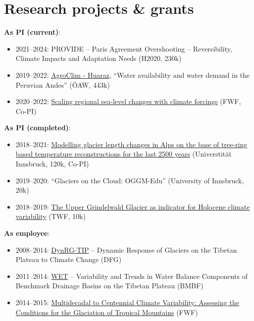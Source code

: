 \section*{Research projects \& grants}
\label{\detokenize{ch08/cv:research-projects-grants}}
\textbf{As PI (current)}:
\begin{itemize}[nosep]
\item {} 
2021--2024: PROVIDE -- Paris Agreement Overshooting -- Reversibility, Climate Impacts and Adaptation Needs (H2020, 230k\texteuro{})

\item {} 
2019--2022: \href{https://agroclim-huaraz.info/}{AgroClim - Huaraz}, “Water availability and water demand in the Peruvian Andes” (ÖAW, 443k\texteuro{})

\item {} 
2020--2022: \href{https://www.uibk.ac.at/acinn/research/ice-and-climate/projects/scaling\_regional\_sea\_level\_changes.html.en}{Scaling regional sea-level changes with climate forcings} (FWF, Co-PI)

\end{itemize}

\textbf{As PI (completed)}:
\begin{itemize}[nosep]
\item {} 
2018--2021: \href{https://www.uibk.ac.at/acinn/research/ice-and-climate/projects/modelling-glacier-length-changes.html.en}{Modelling glacier length changes in Alps on the base of tree-ring based temperature reconstructions for the last 2500 years} (Universtität Innsbruck, 120k\texteuro{}, Co-PI)

\item {} 
2019--2020: “Glaciers on the Cloud: OGGM-Edu” (University of Innsbruck, 20k\texteuro{})

\item {} 
2018--2019: \href{https://www.uibk.ac.at/acinn/research/ice-and-climate/projects/holocene-climate-variability.html.en}{The Upper Grindelwald Glacier as indicator for Holocene climate variability} (TWF, 10k\texteuro{})

\end{itemize}

\textbf{As employee}:
\begin{itemize}[nosep]
\item {} 
2008--2014: \href{https://www.klima.tu-berlin.de/index.php?show=reg\_klima\_hochasien\_dynrgtip\&lan=en}{DynRG-TIP} -- Dynamic Response of Glaciers on the Tibetan Plateau to Climate Change (DFG)

\item {} 
2011--2014: \href{https://www.klima.tu-berlin.de/index.php?show=reg\_klima\_hochasien\_wet\&lan=en}{WET} -- Variability and Trends in Water Balance Components of Benchmark Drainage Basins on the Tibetan Plateau (BMBF)

\item {} 
2014--2015: \href{https://www.uibk.ac.at/acinn/research/ice-and-climate/projects/glaciation-of-tropical-mountains.html.en}{Multidecadal to Centennial Climate Variability: Assessing the Conditions for the Glaciation of Tropical Mountains} (FWF)

\end{itemize}


